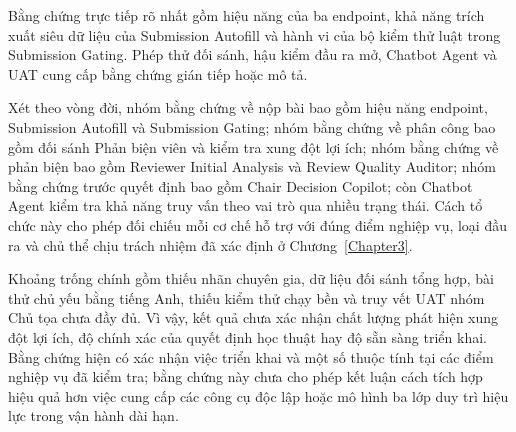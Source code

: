 Bằng chứng trực tiếp rõ nhất gồm hiệu năng của ba endpoint, khả năng trích xuất siêu dữ liệu của Submission Autofill và hành vi của bộ kiểm thử luật trong Submission Gating. Phép thử đối sánh, hậu kiểm đầu ra mở, Chatbot Agent và UAT cung cấp bằng chứng gián tiếp hoặc mô tả.

Xét theo vòng đời, nhóm bằng chứng về nộp bài bao gồm hiệu năng endpoint, Submission Autofill và Submission Gating; nhóm bằng chứng về phân công bao gồm đối sánh Phản biện viên và kiểm tra xung đột lợi ích; nhóm bằng chứng về phản biện bao gồm Reviewer Initial Analysis và Review Quality Auditor; nhóm bằng chứng trước quyết định bao gồm Chair Decision Copilot; còn Chatbot Agent kiểm tra khả năng truy vấn theo vai trò qua nhiều trạng thái. Cách tổ chức này cho phép đối chiếu mỗi cơ chế hỗ trợ với đúng điểm nghiệp vụ, loại đầu ra và chủ thể chịu trách nhiệm đã xác định ở Chương~\ref{Chapter3}.

Khoảng trống chính gồm thiếu nhãn chuyên gia, dữ liệu đối sánh tổng hợp, bài thử chủ yếu bằng tiếng Anh, thiếu kiểm thử chạy bền và truy vết UAT nhóm Chủ tọa chưa đầy đủ. Vì vậy, kết quả chưa xác nhận chất lượng phát hiện xung đột lợi ích, độ chính xác của quyết định học thuật hay độ sẵn sàng triển khai. Bằng chứng hiện có xác nhận việc triển khai và một số thuộc tính tại các điểm nghiệp vụ đã kiểm tra; bằng chứng này chưa cho phép kết luận cách tích hợp hiệu quả hơn việc cung cấp các công cụ độc lập hoặc mô hình ba lớp duy trì hiệu lực trong vận hành dài hạn.
